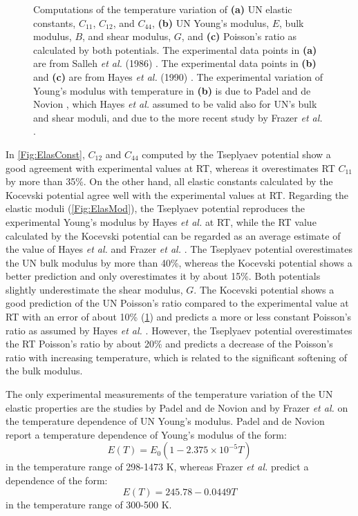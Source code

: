 \documentclass[preprint, 12pt]{elsarticle}
\begin{document}
\begin{figure}[h!]
\begin{subfigure}{0.45\textwidth}
    \caption{}
    \label{Fig:Poisson}
\end{subfigure}
\caption{Computations of the temperature variation of \textbf{(a)} UN elastic constants, $C_{11}$, $C_{12}$, and $C_{44}$, \textbf{(b)} UN Young's modulus, $E$, bulk modulus, $B$, and shear modulus, $G$, and \textbf{(c)} Poisson's ratio as calculated by both potentials. The experimental data points in \textbf{(a)} are from Salleh \textit{et al.} (1986) \cite{Salleh1986}. The experimental data points in \textbf{(b)} and \textbf{(c)} are from Hayes \textit{et al.} (1990) \cite{Hayes1990II}. The experimental variation of Young's modulus with temperature in \textbf{(b)} is due to Padel and de Novion \cite{Padel1969}, which Hayes \textit{et al.} assumed to be valid also for UN's bulk and shear moduli, and due to the more recent study by Frazer \textit{et al.} \cite{Frazer2021}.}
\label{Fig:EC}
\end{figure}

In \cref{Fig:ElasConst}, $C_{12}$ and $C_{44}$ computed by the Tseplyaev potential show a good agreement with experimental values at RT, whereas it overestimates RT $C_{11}$ by more than 35\%. On the other hand, all elastic constants calculated by the Kocevski potential agree well with the experimental values at RT. Regarding the elastic moduli (\cref{Fig:ElasMod}), the Tseplyaev potential reproduces the experimental Young's modulus by Hayes \textit{et al.} \cite{Hayes1990II} at RT, while the RT value calculated by the Kocevski potential can be regarded as an average estimate of the value of Hayes \textit{et al.} \cite{Hayes1990II} and Frazer \textit{et al.} \cite{Frazer2021}. The Tseplyaev potential overestimates the UN bulk modulus by more than 40\%, whereas the Kocevski potential shows a better prediction and only overestimates it by about 15\%. Both potentials slightly underestimate the shear modulus, $G$. The Kocevski potential shows a good prediction of the UN Poisson's ratio compared to the experimental value at RT with an error of about 10\% (\cref{Fig:Poisson}) and predicts a more or less constant Poisson's ratio as assumed by Hayes \textit{et al.} \cite{Hayes1990II}. However, the Tseplyaev potential overestimates the RT Poisson's ratio by about 20\% and predicts a decrease of the Poisson's ratio with increasing temperature, which is related to the significant softening of the bulk modulus.

The only experimental measurements of the temperature variation of the UN elastic properties are the studies by Padel and de Novion \cite{Padel1969} and by Frazer \textit{et al.} \cite{Frazer2021} on the temperature dependence of UN Young's modulus. Padel and de Novion \cite{Padel1969} report a temperature dependence of Young's modulus of the form:
\begin{equation}
E(T)= E_0 \left( 1-2.375 \times 10^{-5} T \right)
\label{Eq:Padel}
\end{equation}
in the temperature range of 298-1473 K, whereas Frazer \textit{et al.} predict a dependence of the form:
\begin{equation}
E(T) = 245.78 - 0.0449 T
\label{Eq:Frazer}
\end{equation}
in the temperature range of 300-500 K.
\end{document}
